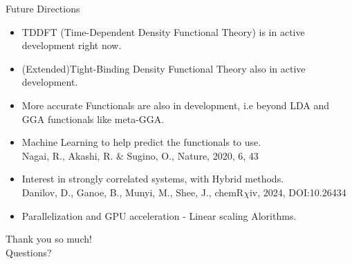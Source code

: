 \documentclass[10pt, aspectratio=169]{beamer}
\begin{document}
\begin{frame}{Future Directions}
\begin{itemize}
    \item TDDFT (Time-Dependent Density Functional Theory) is in active development right now.
    \item (Extended)Tight-Binding Density Functional Theory also in active development.
    \item More accurate Functionals are also in development, i.e beyond LDA and GGA functionals like meta-GGA.
    \item Machine Learning to help predict the functionals to use.\\
    {\centering \scriptsize{Nagai, R., Akashi, R. & Sugino, O., Nature, 2020, 6, 43 }}
    \item Interest in strongly correlated systems, with Hybrid methods.\\
    {\centering \scriptsize{Danilov, D., Ganoe, B., Munyi, M., Shee, J., chemR$\chi$iv, 2024, DOI:10.26434}}
    \item Parallelization and GPU acceleration - Linear scaling Alorithms.
\end{itemize} 
\end{frame}

\begin{frame}{}
\centering
\Large{Thank you so much!}\\
Questions?
    
\end{frame}
\end{document}
